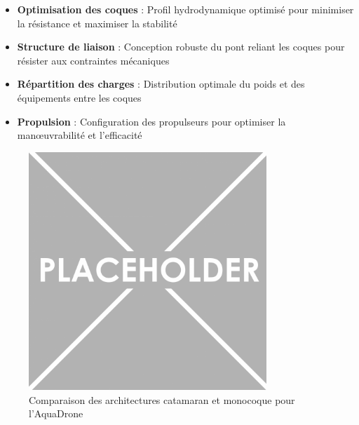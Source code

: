 {\begin{itemize}
    \item \textbf{Optimisation des coques} : Profil hydrodynamique optimisé pour minimiser la résistance et maximiser la stabilité
    \item \textbf{Structure de liaison} : Conception robuste du pont reliant les coques pour résister aux contraintes mécaniques
    \item \textbf{Répartition des charges} : Distribution optimale du poids et des équipements entre les coques
    \item \textbf{Propulsion} : Configuration des propulseurs pour optimiser la manœuvrabilité et l'efficacité
\end{itemize}

\begin{figure}[h]
    \centering
    \includegraphics[width=0.8\textwidth]{Figures/PezizaTuberosa.jpg}
    \caption{Comparaison des architectures catamaran et monocoque pour l'AquaDrone}
    \label{fig:catamaran-comparison}
\end{figure}

}
